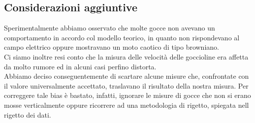     \subsection{Considerazioni aggiuntive}
        Sperimentalmente abbiamo osservato che molte gocce non avevano un comportamento in accordo col modello teorico, in quanto non rispondevano al campo elettrico oppure mostravano un moto caotico di tipo browniano.\\
        Ci siamo inoltre resi conto che la misura delle velocità delle goccioline era affetta da molto rumore ed in alcuni casi perfino distorta.\\
        Abbiamo deciso conseguentemente di scartare alcune misure che, confrontate con il valore universalmente accettato, traslavano il risultato della nostra misura. Per correggere tale bias è bastato, infatti, ignorare le misure di gocce che non si erano mosse verticalmente oppure ricorrere ad una metodologia di rigetto, spiegata nell rigetto dei dati.
